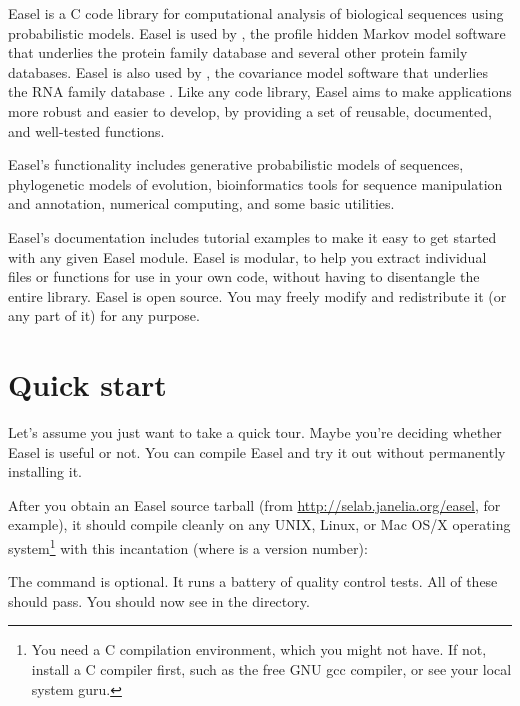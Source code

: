 

Easel is a C code library for computational analysis of biological
sequences using probabilistic models.  Easel is used by 
\citep{hmmer,Eddy98}, the profile hidden Markov model software that
underlies the  protein family database
\citep{Finn06,Sonnhammer97} and several other protein family
databases. Easel is also used by 
\citep{infernal,NawrockiEddy07}, the covariance model software that
underlies the  RNA family database
\citep{Griffiths-Jones05}. Like any code library, Easel aims to make
applications more robust and easier to develop, by providing a set of
reusable, documented, and well-tested functions.

Easel's functionality includes generative probabilistic models of
sequences, phylogenetic models of evolution, bioinformatics tools for
sequence manipulation and annotation, numerical computing, and some
basic utilities. 

Easel's documentation includes tutorial examples to make it easy to
get started with any given Easel module. Easel is modular, to help you
extract individual files or functions for use in your own code,
without having to disentangle the entire library. Easel is open
source. You may freely modify and redistribute it (or any part of it)
for any purpose.

\section{Quick start}

Let's assume you just want to take a quick tour. Maybe you're deciding
whether Easel is useful or not. You can compile Easel and try it out
without permanently installing it.

After you obtain an Easel source tarball (from
\url{http://selab.janelia.org/easel}, for example), it should compile
cleanly on any UNIX, Linux, or Mac OS/X operating system\footnote{You
need a C compilation environment, which you might not have. If not,
install a C compiler first, such as the free GNU gcc compiler, or see
your local system guru.} with this incantation (where  is a
version number):

\begin{cchunk}
\end{cchunk}

The  command is optional. It runs a battery of
quality control tests. All of these should pass. You should now see
 in the directory.


